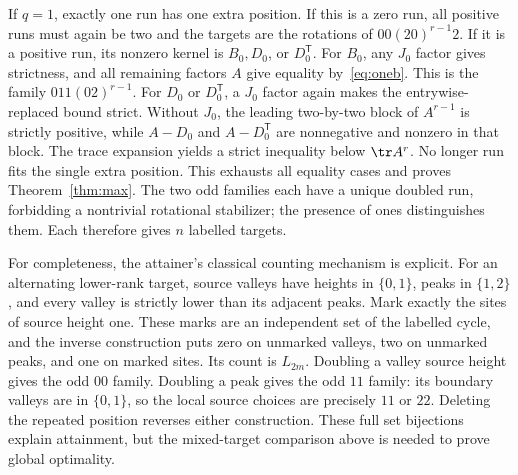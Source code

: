 If $q=1$, exactly one run has one extra position. If this is a zero
run, all positive runs must again be two and the targets are the
rotations of $00(20)^{r-1}2$. If it is a positive run, its nonzero
kernel is $B_0,D_0$, or $D_0^{\mathsf T}$. For $B_0$, any $J_0$
factor gives strictness, and all remaining factors $A$ give equality
by~\eqref{eq:oneb}. This is the family $011(02)^{r-1}$.
For $D_0$ or $D_0^{\mathsf T}$, a $J_0$ factor again makes the
entrywise-replaced bound strict. Without $J_0$, the leading
two-by-two block of $A^{r-1}$ is strictly positive, while $A-D_0$
and $A-D_0^{\mathsf T}$ are nonnegative and nonzero in that block.
The trace expansion yields a strict inequality below $\tr A^r$.
No longer run fits the single extra position. This exhausts all
equality cases and proves Theorem~\ref{thm:max}. The two odd families
each have a unique doubled run, forbidding a nontrivial rotational
stabilizer; the presence of ones distinguishes them. Each therefore
gives $n$ labelled targets.

For completeness, the attainer's classical counting mechanism is
explicit. For an alternating lower-rank target, source valleys have
heights in $\{0,1\}$, peaks in $\{1,2\}$, and every valley is
strictly lower than its adjacent peaks. Mark exactly the sites of
source height one. These marks are an independent set of the labelled
cycle, and the inverse construction puts zero on unmarked valleys,
two on unmarked peaks, and one on marked sites. Its count is $L_{2m}$.
Doubling a valley source height gives the odd $00$ family. Doubling
a peak gives the odd $11$ family: its boundary valleys are in
$\{0,1\}$, so the local source choices are precisely $11$ or $22$.
Deleting the repeated position reverses either construction. These
full set bijections explain attainment, but the mixed-target
comparison above is needed to prove global optimality.
